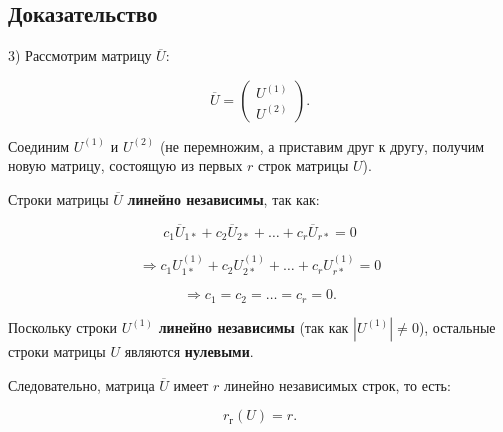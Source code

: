 {\subsection*{Доказательство}

3) Рассмотрим матрицу \( \overline{U} \):



\[
\overline{U} =
\begin{pmatrix}
U^{(1)} \\
U^{(2)}
\end{pmatrix}.
\]



Соединим \( U^{(1)} \) и \( U^{(2)} \) (не перемножим, а приставим друг к другу, получим новую матрицу, состоящую из первых \( r \) строк матрицы \( U \)).

Строки матрицы \( \overline{U} \) \textbf{линейно независимы}, так как:



\[
c_1 \overline{U}_{1*} + c_2 \overline{U}_{2*} + \dots + c_r \overline{U}_{r*} = 0
\]





\[
\Rightarrow c_1 U^{(1)}_{1*} + c_2 U^{(1)}_{2*} + \dots + c_r U^{(1)}_{r*} = 0
\]





\[
\Rightarrow c_1 = c_2 = \dots = c_r = 0.
\]



Поскольку строки \( U^{(1)} \) \textbf{линейно независимы} (так как \( |U^{(1)}| \neq 0 \)), остальные строки матрицы \( U \) являются \textbf{нулевыми}.

Следовательно, матрица \( \overline{U} \) имеет \( r \) линейно независимых строк, то есть:



\[
r_\text{г}(U) = r.
\]




}